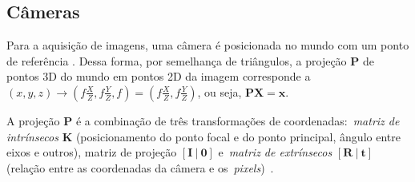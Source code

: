 \subsection{Câmeras}
    \label{subsec:intro_cam}
Para a aquisição de imagens, uma câmera é posicionada no mundo com um ponto de referência
. Dessa forma, por semelhança de triângulos, a projeção $\mathbf{P}$ de pontos 3D do mundo em pontos 2D da imagem corresponde a $(x, y, z) \to (f \frac{X}{Z}, f \frac{Y}{Z}, f) = (f \frac{X}{Z}, f \frac{Y}{Z})$, ou seja, $\mathbf{P} \mathbf{X} = \mathbf{x}$.


A projeção $\mathbf{P}$ é a combinação de três transformações de coordenadas:~\emph{matriz de intrínsecos} $\mathbf{K}$ (posicionamento do ponto focal e do ponto principal, ângulo entre eixos e outros), matriz de projeção $[\mathbf{I} ~|~ \mathbf{0} ]$ e~\emph{matriz de extrínsecos} $[\mathbf{R} ~|~ \mathbf{t} ]$ (relação entre as coordenadas da câmera e os~\emph{pixels})~\cite{FergusL1}.

